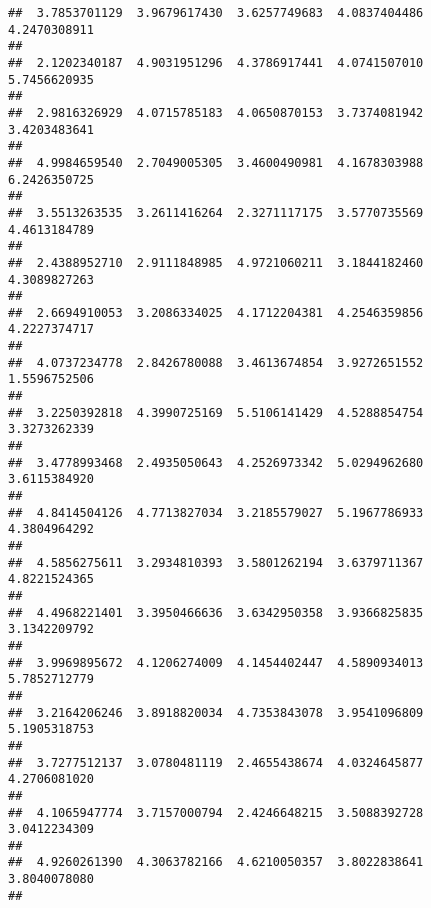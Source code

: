 \documentclass[]{article}
\begin{document}
\begin{verbatim}
##  3.7853701129  3.9679617430  3.6257749683  4.0837404486  4.2470308911 
##                                                                       
##  2.1202340187  4.9031951296  4.3786917441  4.0741507010  5.7456620935 
##                                                                       
##  2.9816326929  4.0715785183  4.0650870153  3.7374081942  3.4203483641 
##                                                                       
##  4.9984659540  2.7049005305  3.4600490981  4.1678303988  6.2426350725 
##                                                                       
##  3.5513263535  3.2611416264  2.3271117175  3.5770735569  4.4613184789 
##                                                                       
##  2.4388952710  2.9111848985  4.9721060211  3.1844182460  4.3089827263 
##                                                                       
##  2.6694910053  3.2086334025  4.1712204381  4.2546359856  4.2227374717 
##                                                                       
##  4.0737234778  2.8426780088  3.4613674854  3.9272651552  1.5596752506 
##                                                                       
##  3.2250392818  4.3990725169  5.5106141429  4.5288854754  3.3273262339 
##                                                                       
##  3.4778993468  2.4935050643  4.2526973342  5.0294962680  3.6115384920 
##                                                                       
##  4.8414504126  4.7713827034  3.2185579027  5.1967786933  4.3804964292 
##                                                                       
##  4.5856275611  3.2934810393  3.5801262194  3.6379711367  4.8221524365 
##                                                                       
##  4.4968221401  3.3950466636  3.6342950358  3.9366825835  3.1342209792 
##                                                                       
##  3.9969895672  4.1206274009  4.1454402447  4.5890934013  5.7852712779 
##                                                                       
##  3.2164206246  3.8918820034  4.7353843078  3.9541096809  5.1905318753 
##                                                                       
##  3.7277512137  3.0780481119  2.4655438674  4.0324645877  4.2706081020 
##                                                                       
##  4.1065947774  3.7157000794  2.4246648215  3.5088392728  3.0412234309 
##                                                                       
##  4.9260261390  4.3063782166  4.6210050357  3.8022838641  3.8040078080 
##                                                                       

\end{verbatim}
\end{document}
